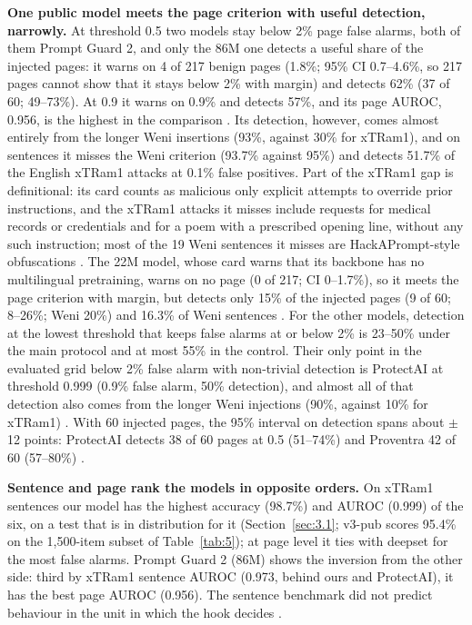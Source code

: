 \documentclass[11pt]{article}
\begin{document}
\textbf{One public model meets the page criterion with useful detection, narrowly.} At threshold 0.5 two models stay below 2\% page false alarms, both of them Prompt Guard 2, and only the 86M one detects a useful share of the injected pages: it warns on 4 of 217 benign pages (1.8\%; 95\% CI 0.7–4.6\%, so 217 pages cannot show that it stays below 2\% with margin) and detects 62\% (37 of 60; 49–73\%). At 0.9 it warns on 0.9\% and detects 57\%, and its page AUROC, 0.956, is the highest in the comparison%
. Its detection, however, comes almost entirely from the longer Weni insertions (93\%, against 30\% for xTRam1), and on sentences it misses the Weni criterion (93.7\% against 95\%) and detects 51.7\% of the English xTRam1 attacks at 0.1\% false positives. Part of the xTRam1 gap is definitional: its card counts as malicious only explicit attempts to override prior instructions, and the xTRam1 attacks it misses include requests for medical records or credentials and for a poem with a prescribed opening line, without any such instruction; most of the 19 Weni sentences it misses are HackAPrompt-style obfuscations%
. The 22M model, whose card warns that its backbone has no multilingual pretraining, warns on no page (0 of 217; CI 0–1.7\%), so it meets the page criterion with margin, but detects only 15\% of the injected pages (9 of 60; 8–26\%; Weni 20\%) and 16.3\% of Weni sentences%
. For the other models, detection at the lowest threshold that keeps false alarms at or below 2\% is 23–50\% under the main protocol and at most 55\% in the control. Their only point in the evaluated grid below 2\% false alarm with non-trivial detection is ProtectAI at threshold 0.999 (0.9\% false alarm, 50\% detection), and almost all of that detection also comes from the longer Weni injections (90\%, against 10\% for xTRam1)%
. With 60 injected pages, the 95\% interval on detection spans about \ensuremath{\pm}12 points: ProtectAI detects 38 of 60 pages at 0.5 (51–74\%) and Proventra 42 of 60 (57–80\%)%
.

\textbf{Sentence and page rank the models in opposite orders.} On xTRam1 sentences our model has the highest accuracy (98.7\%) and AUROC (0.999) of the six, on a test that is in distribution for it (Section~\ref{sec:3.1}; v3-pub scores 95.4\% on the 1,500-item subset of Table~\ref{tab:5}); at page level it ties with deepset for the most false alarms. Prompt Guard 2 (86M) shows the inversion from the other side: third by xTRam1 sentence AUROC (0.973, behind ours and ProtectAI), it has the best page AUROC (0.956). The sentence benchmark did not predict behaviour in the unit in which the hook decides%
.
\end{document}
